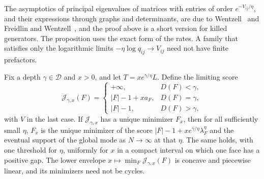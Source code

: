 The asymptotics of principal eigenvalues of matrices with entries of order
$e^{-V_{ij}/\eta}$, and their expressions through graphs and determinants, are due to
Wentzell~\cite{wentzell1972} and Freidlin and
Wentzell~\cite[Chapter~6]{freidlinwentzell2012}, and the proof above is a short
version for killed generators. The proposition uses the exact form of the rates. A family
that satisfies only the logarithmic limits $-\eta\log q_{ij}\to V_{ij}$ need not have finite
prefactors.

\begin{theorem}\label{thm:critical-window}
Fix a depth $\gamma\in\mathcal D$ and $x>0$, and let $T=xe^{\gamma/\eta}L$.
Define the limiting score
\[
 \mathcal J_{\gamma,x}(F)=\begin{cases}+\infty,&D(F)<\gamma,\\ |F|-1+xa_F,&D(F)=\gamma,\\ |F|-1,&D(F)>\gamma,\end{cases}
\]
with $V$ in the last case. If $\mathcal J_{\gamma,x}$ has a unique minimizer $F_x$, then
for all sufficiently small $\eta$, $F_x$ is the unique minimizer of the score
$|F|-1+xe^{\gamma/\eta}\lambda^\eta_F$ and the eventual support of the global mode
as $N\to\infty$ at that $\eta$. The same holds, with one threshold for $\eta$,
uniformly for $x$ in a compact interval on which one face has a positive gap.
The lower envelope
$x\mapsto\min_F\mathcal J_{\gamma,x}(F)$ is concave and piecewise linear, and its
minimizers need not be cycles.
\end{theorem}

